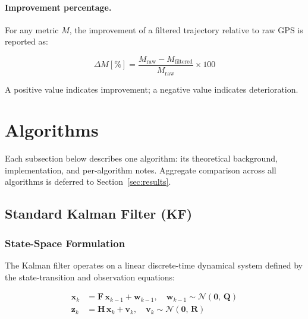 \documentclass[12pt, a4paper]{article}
\begin{document}
\paragraph{Improvement percentage.}
For any metric $M$, the improvement of a filtered trajectory relative to raw
GPS is reported as:

\begin{equation}
    \Delta M [\%] = \frac{M_{\text{raw}} - M_{\text{filtered}}}{M_{\text{raw}}} \times 100
    \label{eq:impr_pct}
\end{equation}

A positive value indicates improvement; a negative value indicates
deterioration.

\section{Algorithms}
\label{sec:algorithms}

Each subsection below describes one algorithm: its theoretical background,
implementation, and per-algorithm notes. Aggregate comparison across all
algorithms is deferred to Section~\ref{sec:results}.

\subsection{Standard Kalman Filter (KF)}
\label{sec:kf}

\subsubsection{State-Space Formulation}

The Kalman filter \cite{kalman1960} operates on a linear discrete-time
dynamical system defined by the state-transition and observation equations:

\begin{align}
    \mathbf{x}_k &= \mathbf{F}\,\mathbf{x}_{k-1} + \mathbf{w}_{k-1},
    \quad \mathbf{w}_{k-1} \sim \mathcal{N}(\mathbf{0},\, \mathbf{Q})
    \label{eq:state_transition} \\
    \mathbf{z}_k &= \mathbf{H}\,\mathbf{x}_k + \mathbf{v}_k,
    \quad \mathbf{v}_k \sim \mathcal{N}(\mathbf{0},\, \mathbf{R})
    \label{eq:observation}
\end{align}
\end{document}
